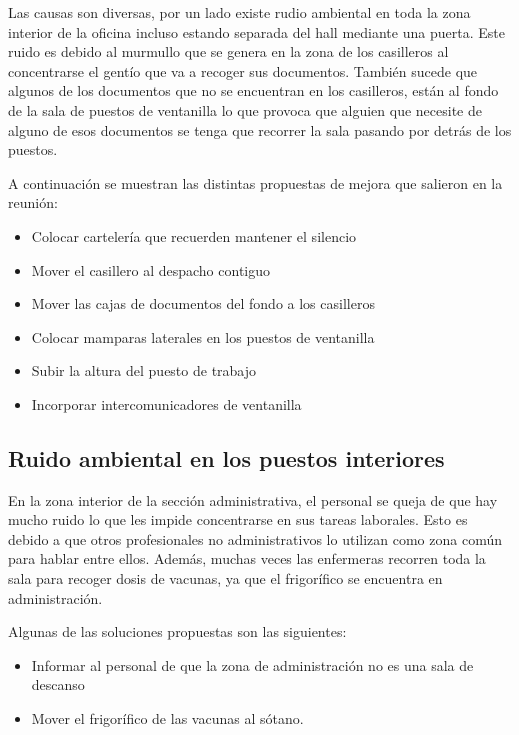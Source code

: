 Las causas son diversas, por un lado existe rudio ambiental en toda la zona interior de la oficina incluso estando separada del hall mediante una puerta.
Este ruido es debido al murmullo que se genera en la zona de los casilleros al concentrarse el gentío que va a recoger sus documentos.
También sucede que algunos de los documentos que no se encuentran en los casilleros, están al fondo de la sala de puestos de ventanilla lo que provoca que alguien que necesite de alguno de esos documentos se tenga que recorrer la sala pasando por detrás de los puestos.

A continuación se muestran las distintas propuestas de mejora que salieron en la reunión:

\begin{itemize}
    \item Colocar cartelería que recuerden mantener el silencio
    \item Mover el casillero al despacho contiguo
    \item Mover las cajas de documentos del fondo a los casilleros
    \item Colocar mamparas laterales en los puestos de ventanilla
    \item Subir la altura del puesto de trabajo
    \item Incorporar intercomunicadores de ventanilla
\end{itemize}

\subsection{Ruido ambiental en los puestos interiores}

En la zona interior de la sección administrativa, el personal se queja de que hay mucho ruido lo que les impide concentrarse en sus tareas laborales.
Esto es debido a que otros profesionales no administrativos lo utilizan como zona común para hablar entre ellos.
Además, muchas veces las enfermeras recorren toda la sala para recoger dosis de vacunas, ya que el frigorífico se encuentra en administración.

Algunas de las soluciones propuestas son las siguientes:

\begin{itemize}
    \item Informar al personal de que la zona de administración no es una sala de descanso
    \item Mover el frigorífico de las vacunas al sótano.
\end{itemize}

